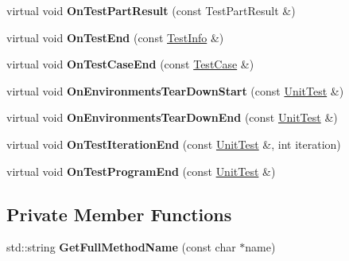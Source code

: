 \begin{DoxyCompactItemize}
virtual void {\bfseries On\+Test\+Part\+Result} (const Test\+Part\+Result \&)
\item 
\mbox{\label{classtesting_1_1internal_1_1_event_recording_listener_adb076f145cc20d9b27441b9c75da4b81}} 
virtual void {\bfseries On\+Test\+End} (const \mbox{\hyperlink{classtesting_1_1_test_info}{Test\+Info}} \&)
\item 
\mbox{\label{classtesting_1_1internal_1_1_event_recording_listener_a4d0cb8a389c7339bce0aa6128291529f}} 
virtual void {\bfseries On\+Test\+Case\+End} (const \mbox{\hyperlink{classtesting_1_1_test_case}{Test\+Case}} \&)
\item 
\mbox{\label{classtesting_1_1internal_1_1_event_recording_listener_a17eebd7bb5cc6bab53b20794919ca5ae}} 
virtual void {\bfseries On\+Environments\+Tear\+Down\+Start} (const \mbox{\hyperlink{classtesting_1_1_unit_test}{Unit\+Test}} \&)
\item 
\mbox{\label{classtesting_1_1internal_1_1_event_recording_listener_acd5a3dc070265166a7da68222031fd61}} 
virtual void {\bfseries On\+Environments\+Tear\+Down\+End} (const \mbox{\hyperlink{classtesting_1_1_unit_test}{Unit\+Test}} \&)
\item 
\mbox{\label{classtesting_1_1internal_1_1_event_recording_listener_ab0cc007bcfaf06cd383d574c88f62aea}} 
virtual void {\bfseries On\+Test\+Iteration\+End} (const \mbox{\hyperlink{classtesting_1_1_unit_test}{Unit\+Test}} \&, int iteration)
\item 
\mbox{\label{classtesting_1_1internal_1_1_event_recording_listener_a21fe9c3c519c4599a48b16ddfb734aa3}} 
virtual void {\bfseries On\+Test\+Program\+End} (const \mbox{\hyperlink{classtesting_1_1_unit_test}{Unit\+Test}} \&)
\end{DoxyCompactItemize}
\subsection*{Private Member Functions}
\begin{DoxyCompactItemize}
\item 
\mbox{\label{classtesting_1_1internal_1_1_event_recording_listener_a3d6212ced3e7a32e0e5944f2eba47c0b}} 
std\+::string {\bfseries Get\+Full\+Method\+Name} (const char $\ast$name)
\end{DoxyCompactItemize}
